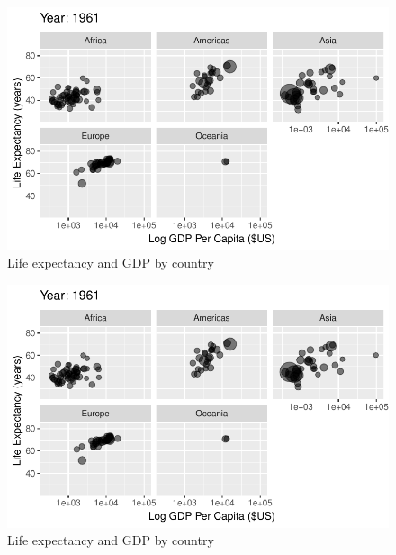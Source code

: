 \documentclass[
  letterpaper,
  DIV=11,
  numbers=noendperiod]{scrreport}
\theoremstyle{definition}
\theoremstyle{remark}
\begin{document}
\begin{figure}

{\centering \includegraphics{index_files/figure-pdf/fig-anim-lifegdp-17.pdf}

}

\caption{\label{fig-anim-lifegdp-17}Life expectancy and GDP by country}

\end{figure}

\begin{figure}

{\centering \includegraphics{index_files/figure-pdf/fig-anim-lifegdp-18.pdf}

}

\caption{\label{fig-anim-lifegdp-18}Life expectancy and GDP by country}

\end{figure}
\end{document}
